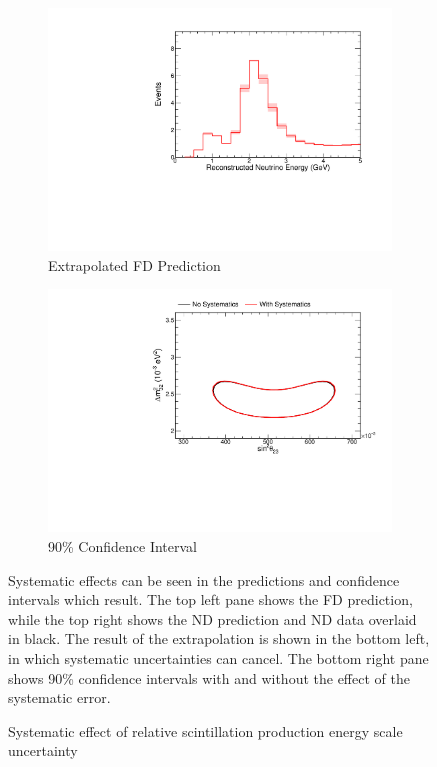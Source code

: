 {\begin{figure}
\begin{center}
\begin{subfigure}[c]{0.49\textwidth}
\includegraphics[width=\textwidth]{figures/systs/prediction/fd_extrap_prediction_birksScaleRel.pdf}
\caption*{Extrapolated FD Prediction}
\end{subfigure}
\begin{subfigure}[c]{0.49\textwidth}
\includegraphics[width=\textwidth]{figures/systs/prediction/fd_extrap_contour_birksScaleRel.pdf}
\caption*{90\% Confidence Interval}
\end{subfigure}
\end{center}
\caption{Systematic effect of relative scintillation production energy scale uncertainty}{
Systematic effects can be seen in the predictions and confidence intervals
which result.
The top left pane shows the FD prediction, while the top right shows the
ND prediction and ND data overlaid in black.
The result of the extrapolation is shown in the bottom left, in which
systematic uncertainties can cancel.
The bottom right pane shows 90\% confidence intervals with and without
the effect of the systematic error.}
\label{syst_fig_birksScaleRel}


\end{figure}}
